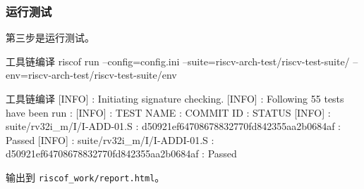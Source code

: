 \documentclass[xcolor=table,dvipsnames,svgnames,aspectratio=169]{ctexbeamer}
\begin{document}
\begin{frame}
  \frametitle{运行测试}

  第三步是运行测试。

  \begin{codeblock}[language=bash]{工具链编译}
riscof run --config=config.ini --suite=riscv-arch-test/riscv-test-suite/ --env=riscv-arch-test/riscv-test-suite/env
  \end{codeblock}
  \begin{codeblock}[language=bash]{工具链编译}
[INFO]    : Initiating signature checking.
[INFO]    : Following 55 tests have been run :
[INFO]    : TEST NAME                                          : COMMIT ID                                : STATUS
[INFO]    : suite/rv32i_m/I/I-ADD-01.S                         : d50921ef64708678832770fd842355aa2b0684af : Passed
[INFO]    : suite/rv32i_m/I/I-ADDI-01.S                        : d50921ef64708678832770fd842355aa2b0684af : Passed
  \end{codeblock}

  输出到 \lstinline|riscof_work/report.html|。
\end{frame}
\end{document}
